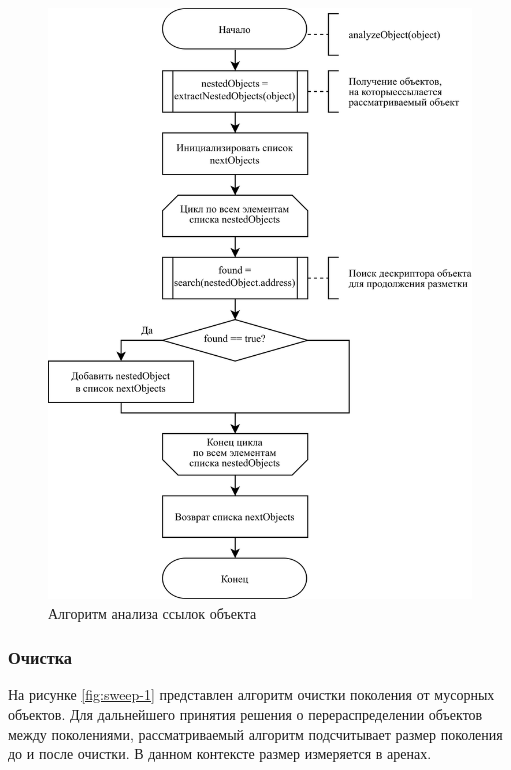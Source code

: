 \begin{figure}[H]
	\centering
	\includegraphics[scale=0.185]{assets/mark-4.png}
	\caption{Алгоритм анализа ссылок объекта}
	\label{fig:mark-4}
\end{figure}

\subsubsection{Очистка}

На рисунке \ref{fig:sweep-1} представлен алгоритм очистки поколения от мусорных объектов. Для дальнейшего принятия решения о перераспределении объектов между поколениями, рассматриваемый алгоритм подсчитывает размер поколения до и после очистки. В данном контексте размер измеряется в аренах.

